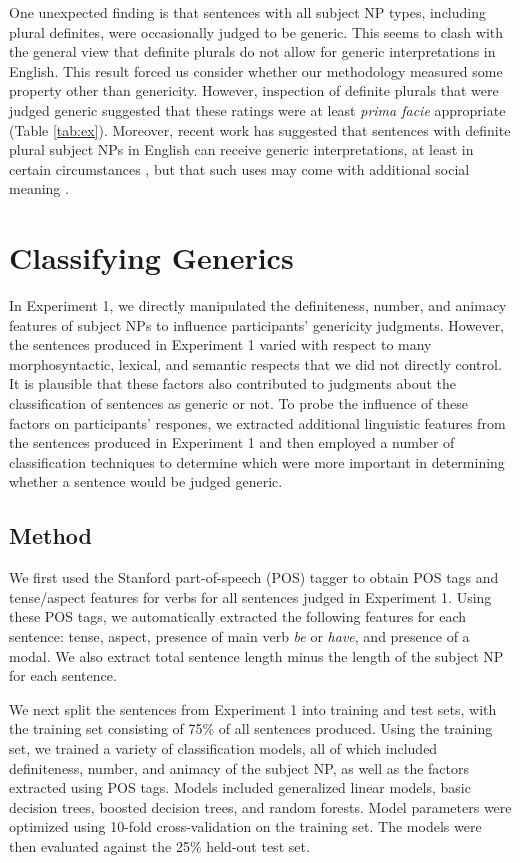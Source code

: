 \documentclass[10pt,letterpaper]{article}
\begin{document}
One unexpected finding is that sentences with all subject NP types, including plural definites, were occasionally judged to be generic. This seems to clash with the general view that definite plurals do not allow for generic interpretations in English. This result forced us consider whether our methodology measured some property other than genericity. However, inspection of definite plurals that were judged generic suggested that these ratings were at least \emph{prima facie} appropriate (Table \ref{tab:ex}). Moreover, recent work has suggested that sentences with definite plural subject NPs in English can receive generic interpretations, at least in certain circumstances \cite{FarkasDeSwart2007}, but that such uses may come with additional social meaning \cite{Acton:2014}.

\section{Classifying Generics}

In Experiment 1, we directly manipulated the definiteness, number, and animacy features of subject NPs to influence participants' genericity judgments. However, the sentences produced in Experiment 1 varied with respect to many morphosyntactic, lexical, and semantic respects that we did not directly control. It is plausible that these factors also contributed to judgments about the classification of sentences as generic or not. To probe the influence of these factors on participants' respones, we extracted additional linguistic features from the sentences produced in Experiment 1 and then employed a number of classification techniques to determine which were more important in determining whether a sentence would be judged generic.

\subsection{Method}

We first used the Stanford part-of-speech (POS) tagger \cite{Toutanova:2003} to obtain POS tags and tense/aspect features for verbs for all sentences judged in Experiment 1. Using these POS tags, we automatically extracted the following features for each sentence: tense, aspect, presence of main verb \textit{be} or \textit{have}, and presence of a modal. We also extract total sentence length minus the length of the subject NP for each sentence.

We next split the sentences from Experiment 1 into training and test sets, with the training set consisting of 75\% of all sentences produced. Using the training set, we trained a variety of classification models, all of which included definiteness, number, and animacy of the subject NP, as well as the factors extracted using POS tags. Models included generalized linear models, basic decision trees, boosted decision trees, and random forests. Model parameters were optimized using 10-fold cross-validation on the training set. The models were then evaluated against the 25\% held-out test set.
\end{document}
